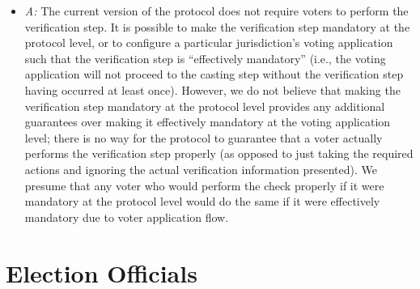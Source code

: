 \documentclass[12pt,letter]{article}
\begin{document}
\begin{itemize}
    \item \emph{A:} The current version of the protocol does not require voters to perform the verification step. It is possible to make the verification step mandatory at the protocol level, or to configure a particular jurisdiction's voting application such that the verification step is ``effectively mandatory'' (i.e., the voting application will not proceed to the casting step without the verification step having occurred at least once). However, we do not believe that making the verification step mandatory at the protocol level provides any additional guarantees over making it effectively mandatory at the voting application level; there is no way for the protocol to guarantee that a voter actually performs the verification step properly (as opposed to just taking the required actions and ignoring the actual verification information presented). We presume that any voter who would perform the check properly if it were mandatory at the protocol level would do the same if it were effectively mandatory due to voter application flow.

\end{itemize}

\section{Election Officials}
\end{document}
